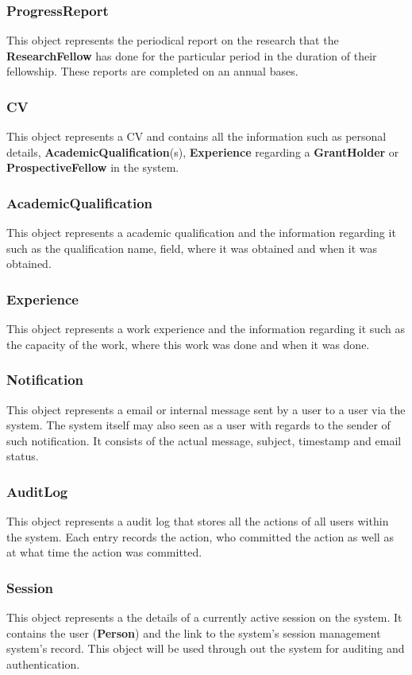 \documentclass[12pt]{article}
\begin{document}
\subsubsection{ProgressReport}
This object represents the periodical report on the research that the \textbf{ResearchFellow} has done for the particular period in the duration of their fellowship. These reports are completed on an annual bases.

\subsubsection{CV}
This object represents a CV and contains all the information such as personal details, \textbf{AcademicQualification}(s), \textbf{Experience} regarding a \textbf{GrantHolder} or \textbf{ProspectiveFellow} in the system.

\subsubsection{AcademicQualification}
This object represents a academic qualification and the information regarding it such as the qualification name, field, where it was obtained and when it was obtained.

\subsubsection{Experience}
This object represents a work experience and the information regarding it such as the capacity of the work, where this work was done and when it was done.

\subsubsection{Notification}
This object represents a email or internal message sent by a user to a user via the system. The system itself may also seen as a user with regards to the sender of such notification. It consists of the actual message, subject, timestamp and email status. 

\subsubsection{AuditLog}
This object represents a audit log that stores all the actions of all users within the system. Each entry records the action, who committed the action as well as at what time the action was committed.

\subsubsection{Session}
This object represents a the details of a currently active session on the system. It contains the user (\textbf{Person}) and the link to the system's session management system's record. This object will be used through out the system for auditing and authentication. 
\end{document}
